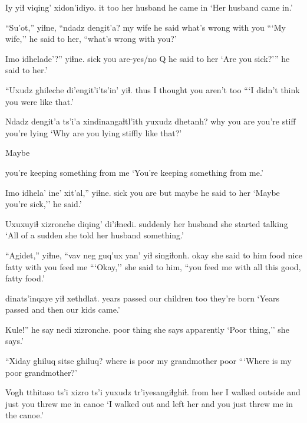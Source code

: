 \documentclass[12pt]{article}
\begin{document}
\gll Iy yiɬ viqing'     xidon'idiyo.
it too {her husband} {he came in}
\glt `Her husband came in.'
\glend

\gll ``Su'ot,''  yiɬne,  ``{ndadz dengit'a?} 
{my wife} {he said} {what's wrong with you} 
\glt ```My wife,'' he said to her, ``what's wrong with you?' 
\glend

\gll Imo  idhelade'?'' yiɬne.
sick {you are-yes/no Q}  {he said to her}
\glt `Are you sick?''' he said to her.'
\glend

\gll ``Uxudz {ghileche} {di'engit'i'ts'in'} yiɬ.
thus {I thought}   {you aren't} too
\glt ```I didn't think you were like that.'
\glend

\gll Ndadz dengit'a ts'i'a xindinangaɬtl'ith   yuxudz dhetanh?
why   {you are} {}    {you're stiff} {}   {you're lying}
\glt `Why are you lying stiffly like that?'
\glend

Maybe 

{{you're keeping something from me}}
\glt `You're keeping something from me.'
\glend

\gll Imo  idhela' ine' xit'al,'' yiɬne.
sick {you are} but  maybe  {he said to her}
\glt `Maybe you're sick,'' he said.'
\glend

\gll Uxuxuyiɬ xizronche diqing'     di'iɬnedi.
suddenly  {}       {her husband} {she started talking}
\glt `All of a sudden she told her husband something.'
\glend

\gll ``Agidet,'' yiɬne, ``vav  neg  {guq'ux yan'} yiɬ  singiɬonh.
okay    {she said to him} food nice fatty         with {you feed me}
\glt ```Okay,'' she said to him, ``you feed me with all this good, fatty food.'
\glend

     dinats'inqaye yiɬ xethdlat.
{years passed} {our children} too {they're born}
\glt `Years passed and then our kids came.'
\glend

\gll Kule!''         {he say} nedi xizronche.
{poor thing }     {}   {she says} apparently
\glt `Poor thing,'' she says.'
\glend

\gll ``Xiday    ghiluq  sitse          ghiluq? 
{where is} poor  {my grandmother} poor
\glt ```Where is my poor grandmother?'
\glend

\gll Vogh     tthitaso         ts'i xizro ts'i yuxudz tr'iyesangiɬghiɬ.
{from her} {I walked outside} and  {} {} just   {you threw me in canoe}
\glt `I walked out and left her and you just threw me in the canoe.'
\glend
\end{document}
